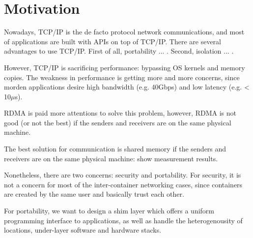 \section{Motivation}

Nowadays, TCP/IP is the de facto protocol network communications, and most of applications
are built with APIs on top of TCP/IP. There are several advantages to use TCP/IP. First of all, 
portability ... . Second, isolation ... .

However, TCP/IP is sacrificing performance: bypassing OS kernels and memory copies.
The weakness in performance is getting more and more concerns, since morden applications
desire high bandwidth (e.g. 40Gbps) and low latency (e.g. < 10$\mu$s).

RDMA is paid more attentions to solve this problem, however, RDMA is not good (or not the best) if the senders and receivers
are on the same physical machine. 

The best solution for communication is shared memory if the senders and receivers are on the 
same physical machine: show measurement results.

Nonetheless, there are two concerns: security and portability.
For security, it is not a concern for most of the inter-container networking cases, since containers are created by the same user and basically trust each other.

For portability, we want to design a shim layer which offers a uniform programming interface to applications, as well as handle the heterogenousity of locations, under-layer software and hardware stacks.

